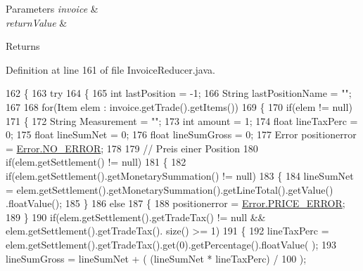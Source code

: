 \begin{DoxyParams}{Parameters}
{\em invoice} & \\
\hline
{\em return\-Value} & \\
\hline
\end{DoxyParams}
\begin{DoxyReturn}{Returns}

\end{DoxyReturn}


Definition at line 161 of file Invoice\-Reducer.\-java.


\begin{DoxyCode}
162     \{
163         \textcolor{keywordflow}{try}
164         \{
165         \textcolor{keywordtype}{int} lastPosition = -1;
166         String lastPositionName = \textcolor{stringliteral}{""};
167         
168         \textcolor{keywordflow}{for}(Item elem : invoice.getTrade().getItems())
169         \{
170             \textcolor{keywordflow}{if}(elem != null)
171             \{
172                 String Measurement = \textcolor{stringliteral}{""};
173                 \textcolor{keywordtype}{int} amount = 1;
174                 \textcolor{keywordtype}{float} lineTaxPerc = 0;
175                 \textcolor{keywordtype}{float} lineSumNet = 0;
176                 \textcolor{keywordtype}{float} lineSumGross = 0;
177                 Error positionerror = \hyperlink{enum_reduced_invoice_1_1_a_invoice_1_1_error_ab758351b18ce3163abca9924287fc6df}{Error.NO\_ERROR};
178                 
179                 \textcolor{comment}{// Preis einer Position}
180                 \textcolor{keywordflow}{if}(elem.getSettlement() != null)
181                 \{
182                     \textcolor{keywordflow}{if}(elem.getSettlement().getMonetarySummation() != null)
183                     \{
184                         lineSumNet = elem.getSettlement().getMonetarySummation().getLineTotal().getValue()
      .floatValue();
185                     \}
186                     \textcolor{keywordflow}{else}
187                     \{
188                         positionerror = \hyperlink{enum_reduced_invoice_1_1_a_invoice_1_1_error_a5c521b3b1cc9827b5dba56d42a770481}{Error.PRICE\_ERROR};
189                     \}
190                     \textcolor{keywordflow}{if}(elem.getSettlement().getTradeTax() != null  && elem.getSettlement().getTradeTax().
      size() >= 1)
191                     \{
192                         lineTaxPerc = elem.getSettlement().getTradeTax().get(0).getPercentage().floatValue(
      );
193                         lineSumGross = lineSumNet + ( (lineSumNet * lineTaxPerc) / 100 );

\end{DoxyCode}
